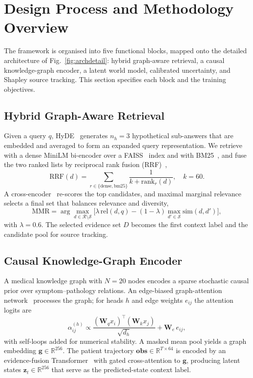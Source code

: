 \documentclass[11pt,a4paper]{report}
\newcommand{\zt}{\mathbf{z}_t}
\begin{document}
\section{Design Process and Methodology Overview}
The framework is organised into five functional blocks, mapped onto the detailed
architecture of Fig.~\ref{fig:archdetail}: hybrid graph-aware retrieval, a causal
knowledge-graph encoder, a latent world model, calibrated uncertainty, and
Shapley source tracking. This section specifies each block and the training
objectives.

\subsection{Hybrid Graph-Aware Retrieval}
Given a query $q$, HyDE~\cite{gao2023hyde} generates $n_h{=}3$ hypothetical
sub-answers that are embedded and averaged to form an expanded query
representation. We retrieve with a dense MiniLM bi-encoder over a
FAISS~\cite{johnson2019faiss} index and with BM25~\cite{robertson2009bm25}, and
fuse the two ranked lists by reciprocal rank fusion
(RRF)~\cite{cormack2009rrf},
\begin{equation}
\mathrm{RRF}(d)=\sum_{r\in\{\text{dense},\text{bm25}\}}\frac{1}{k+\mathrm{rank}_r(d)},
\quad k=60 .
\end{equation}
A cross-encoder~\cite{nogueira2019passage} re-scores the top candidates, and
maximal marginal relevance~\cite{carbonell1998mmr} selects a final set that
balances relevance and diversity,
\begin{equation}
\mathrm{MMR}=\arg\max_{d\in\mathcal{R}\setminus\mathcal{S}}
\big[\lambda\,\mathrm{rel}(d,q)-(1{-}\lambda)\max_{d'\in\mathcal{S}}\mathrm{sim}(d,d')\big],
\end{equation}
with $\lambda{=}0.6$. The selected evidence set $D$ becomes the first context
label and the candidate pool for source tracking.

\subsection{Causal Knowledge-Graph Encoder}
A medical knowledge graph with $N{=}20$ nodes encodes a sparse stochastic causal
prior over symptom--pathology relations. An edge-biased graph-attention
network~\cite{velickovic2018gat} processes the graph; for heads $h$ and edge
weights $e_{ij}$ the attention logits are
\begin{equation}
\alpha_{ij}^{(h)}\propto\frac{(\mathbf{W}_q x_i)^\top(\mathbf{W}_k x_j)}{\sqrt{d_h}}
+ \mathbf{W}_e\, e_{ij},
\end{equation}
with self-loops added for numerical stability. A masked mean pool yields a graph
embedding $\mathbf{g}\in\mathbb{R}^{256}$. The patient trajectory
$\mathbf{obs}\in\mathbb{R}^{T\times64}$ is encoded by an evidence-fusion
Transformer~\cite{vaswani2017attention} with gated cross-attention to
$\mathbf{g}$, producing latent states $\zt\in\mathbb{R}^{256}$ that serve as the
predicted-state context label.
\end{document}
